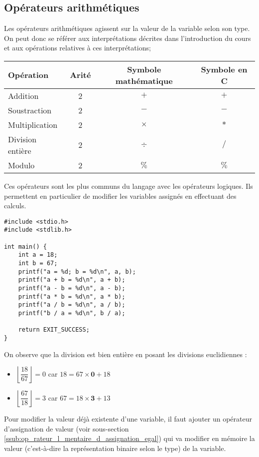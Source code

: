 \documentclass[../../../main.tex]{subfiles}
\begin{document}
\subsection{Opérateurs arithmétiques}
\label{sub:op_rateurs_arithm_tiques}
Les opérateurs arithmétiques agissent sur la valeur de la variable selon son type. On peut donc se référer aux interprétations décrites dans l'introduction du cours et aux opérations relatives à ces interprétations;
\begin{center}
\begin{tabular}{l|c|c|c}
Opération & Arité & Symbole mathématique & Symbole en C \\
\hline
Addition & 2 & $+$ & $+$ \\
Soustraction & 2 & $-$ & $-$ \\
Multiplication & 2 & $\times$ & $*$ \\
Division entière & 2 & $\div$ & $/$ \\
Modulo & 2 & $\%$ & $\%$
\end{tabular}
\end{center}
Ces opérateurs sont les plus communs du langage avec les opérateurs logiques. Ils permettent en particulier de modifier les variables assignés en effectuant des calculs.
\begin{verbatim}
#include <stdio.h>
#include <stdlib.h>

int main() {
	int a = 18;
	int b = 67;
	printf("a = %d; b = %d\n", a, b);
	printf("a + b = %d\n", a + b);
	printf("a - b = %d\n", a - b);
	printf("a * b = %d\n", a * b);
	printf("a / b = %d\n", a / b);
	printf("b / a = %d\n", b / a);

	return EXIT_SUCCESS;
}
\end{verbatim}
On observe que la division est bien entière en posant les divisions euclidiennes :
\begin{itemize}
	\item $\left\lfloor{\dfrac{18}{67}}\right\rfloor = 0$ car $18 = 67\times{\textbf{0}} + 18$
	\item $\left\lfloor{\dfrac{67}{18}}\right\rfloor = 3$ car $67 = 18\times{\textbf{3}} + 13$
\end{itemize}
Pour modifier la valeur déjà existente d'une variable, il faut ajouter un opérateur d'assignation de valeur (voir sous-section \ref{ssub:op_rateur_l_mentaire_d_assignation_egal}) qui va modifier en mémoire la valeur (c'est-à-dire la représentation binaire selon le type) de la variable.
%  
\end{document}
